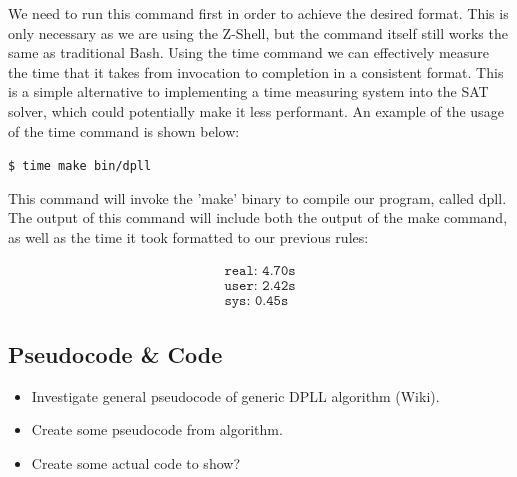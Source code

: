 \documentclass{article}
\begin{document}
We need to run this command first in order to achieve the desired format. This is only necessary as we are using the
Z-Shell, but the command itself still works the same as traditional Bash. Using the time command we can effectively measure the time that it takes from invocation to completion in a consistent format. This is a simple alternative to implementing a time measuring system into the SAT solver, which could potentially make it less performant. An example of the usage of the time command is shown below:

\begin{center}
    \texttt{\$ time make bin/dpll}
\end{center}

This command will invoke the 'make' binary to compile our program, called dpll. The output of this command will include both the output of the make command, as well as the time it took formatted to our previous rules:

\begin{align*}
    \texttt{real: 4.70s} \\
    \texttt{user: 2.42s} \\
    \texttt{sys: 0.45s}
\end{align*}


\subsection{Pseudocode \& Code}
\begin{itemize}
    \item Investigate general pseudocode of generic DPLL algorithm (Wiki).
    \item Create some pseudocode from algorithm.
    \item Create some actual code to show?
\end{itemize}
\end{document}
